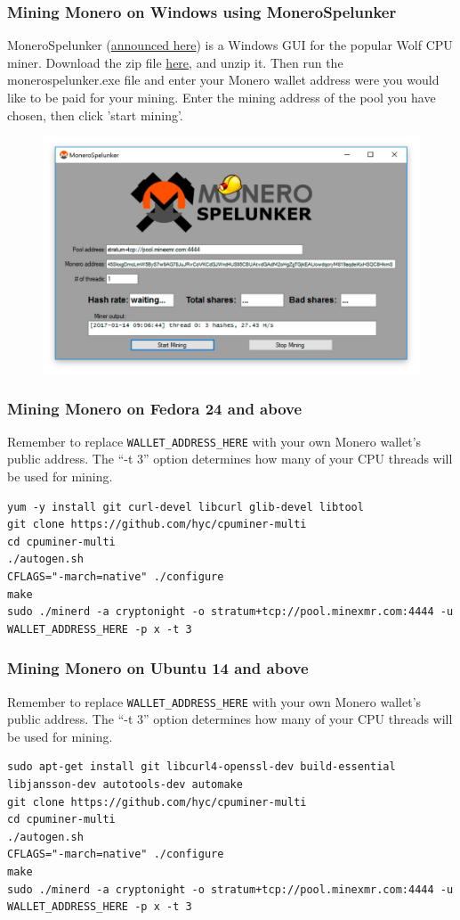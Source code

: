 \subsubsection{Mining Monero on Windows using MoneroSpelunker}
MoneroSpelunker (\href{https://www.reddit.com/r/Monero/comments/51c36c/gui_is_finally_here/}{announced here}) is a Windows GUI for the popular Wolf CPU miner. Download the zip file \href{https://github.com/jwinterm/monerospelunker/releases}{here}, and unzip it. Then run the monerospelunker.exe file and enter your Monero wallet address were you would like to be paid for your mining. Enter the mining address of the pool you have chosen, then click 'start mining'. 
	\begin{figure}[htbp!]
		\centering
		\includegraphics[width=0.8\linewidth]{./images/manual/spelunkerminer.jpg}
	\end{figure}
\subsubsection{Mining Monero on Fedora 24 and above}
Remember to replace \lstinline!WALLET_ADDRESS_HERE! with your own Monero wallet's public address. The ``-t 3'' option determines how many of your CPU threads will be used for mining. 
\begin{lstlisting}
yum -y install git curl-devel libcurl glib-devel libtool
git clone https://github.com/hyc/cpuminer-multi
cd cpuminer-multi
./autogen.sh
CFLAGS="-march=native" ./configure
make
sudo ./minerd -a cryptonight -o stratum+tcp://pool.minexmr.com:4444 -u WALLET_ADDRESS_HERE -p x -t 3
\end{lstlisting}
\subsubsection{Mining Monero on Ubuntu 14 and above}
	Remember to replace \lstinline!WALLET_ADDRESS_HERE! with your own Monero wallet's public address. The ``-t 3'' option determines how many of your CPU threads will be used for mining.
\begin{lstlisting}
sudo apt-get install git libcurl4-openssl-dev build-essential libjansson-dev autotools-dev automake
git clone https://github.com/hyc/cpuminer-multi
cd cpuminer-multi
./autogen.sh
CFLAGS="-march=native" ./configure
make
sudo ./minerd -a cryptonight -o stratum+tcp://pool.minexmr.com:4444 -u WALLET_ADDRESS_HERE -p x -t 3
\end{lstlisting}
